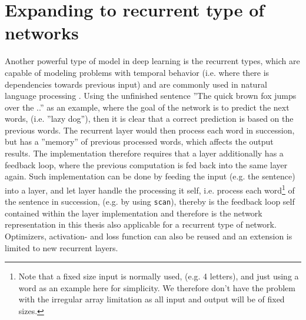 {	\section{Expanding to recurrent type of networks}
	Another powerful type of model in deep learning is the recurrent types, which
	are capable of modeling problems with temporal behavior (i.e. where there is
	dependencies towards previous input) and are commonly used in natural language
	processing \cite{DBLP:journals/corr/abs-1801-01078}. 
	Using the unfinished sentence ''The quick brown fox jumps over the ..'' as an
	example, where the goal of the network is to predict the next words, (i.e.
	''lazy dog''), then it is clear that a correct prediction is based on the
	previous words.
	The recurrent layer would then process each word in succession, but has a
	''memory'' of previous processed words, which affects the output results. 
	The implementation therefore requires that a layer additionally has a feedback
	loop, where the previous computation is fed back into the same layer again. 
	Such implementation can be done by feeding the input (e.g. the sentence) into a
	layer, and let layer handle the processing it self, i.e. process each
	word\footnote{Note that a fixed size input is normally used, (e.g. 4 letters),
		and just using a word as an example here for simplicity. We therefore don't have
		the problem with the irregular array limitation as all input and output will be
		of fixed sizes.} of the sentence in succession, (e.g. by using \texttt{scan}),
	thereby is the feedback loop self contained within the layer implementation and
	therefore is the network representation in this thesis also applicable for a
	recurrent type of network. 
	Optimizers, activation- and loss function can also be reused and an extension is
	limited to new recurrent layers. 
	
}
